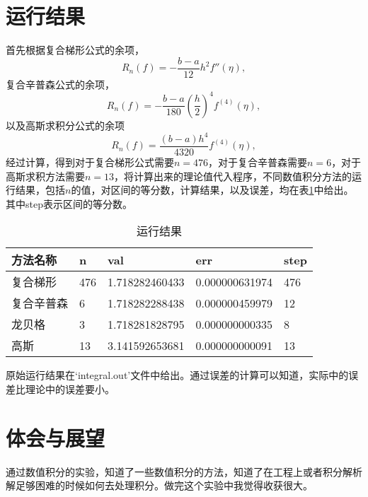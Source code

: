 \documentclass{article}
\theoremstyle{plain}
\theoremstyle{definition}
\theoremstyle{remark}
\begin{document}
    \section{运行结果}
    首先根据复合梯形公式的余项，
    \[R_n(f) = -\frac{b-a}{12}h^2f''(\eta),\]
    复合辛普森公式的余项，
    \[R_n(f) = -\frac{b-a}{180}\left(\frac{h}{2}\right)^4f^{(4)}(\eta),\]
    以及高斯求积分公式的余项
    \[R_n(f) = \frac{(b-a)h^4}{4320}f^{(4)}(\eta),\]
    经过计算，得到对于复合梯形公式需要$n=476$，对于复合辛普森需要$n=6$，对于高斯求积方法需要$n=13$，将计算出来的理论值代入程序，不同数值积分方法的运行结果，包括$n$的值，对区间的等分数，计算结果，以及误差，均在表\ref{result}中给出。其中step表示区间的等分数。

    \begin{table}[!htbp]
        \centering
        \begin{tabular}{l|llll}
            \hline
            \hline
            方法名称 & n   & val            & err            & step \\
            \hline
            复合梯形 & 476 & 1.718282460433 & 0.000000631974 & 476  \\
            复合辛普森 & 6   & 1.718282288438 & 0.000000459979 & 12   \\
            龙贝格 & 3   & 1.718281828795 & 0.000000000335 & 8    \\
            高斯 & 13  & 3.141592653681 & 0.000000000091 & 13 \\
            \hline
            \hline 
        \end{tabular}
        \caption{运行结果}
        \label{result}
    \end{table}

    原始运行结果在`integral.out'文件中给出。通过误差的计算可以知道，实际中的误差比理论中的误差要小。
    
    \section{体会与展望}
    通过数值积分的实验，知道了一些数值积分的方法，知道了在工程上或者积分解析解足够困难的时候如何去处理积分。做完这个实验中我觉得收获很大。
    
    
\end{document}
